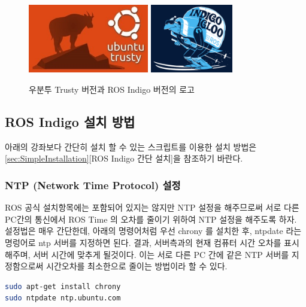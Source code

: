 \begin{figure}[h]
\centering\includegraphics[height=30mm]{pictures/chapter2/ubuntu_14_04.jpg}
\centering\includegraphics[height=30mm]{pictures/chapter2/indigo_igloo.png}
\caption{우분투 Trusty 버전과 ROS Indigo 버전의 로고}
\end{figure}


\subsection{ROS Indigo 설치 방법}
\label{sec:ROSInstallation}

\begin{exercise}[간단 설치]
아래의 강좌보다 간단히 설치 할 수 있는 스크립트를 이용한 설치 방법은 \ref{sec:SimpleInstallation}[ROS Indigo 간단 설치]을 참조하기 바란다.
\end{exercise}

\subsubsection{NTP (Network Time Protocol) 설정}
ROS 공식 설치항목에는 포함되어 있지는 않지만 NTP 설정을 해주므로써 서로 다른 PC간의 통신에서 ROS Time 의 오차를 줄이기 위하여 NTP 설정을 해주도록 하자. 설정법은 매우 간단한데, 아래의 명령어처럼 우선 chrony 를 설치한 후, ntpdate 라는 명렁어로 ntp 서버를 지정하면 된다. 결과, 서버측과의 현재 컴퓨터 시간 오차를 표시해주며, 서버 시간에 맞추게 될것이다. 이는 서로 다른 PC 간에 같은 NTP 서버를 지정함으로써 시간오차를 최소한으로 줄이는 방법이라 할 수 있다.

\begin{lstlisting}[language=bash]
sudo apt-get install chrony
sudo ntpdate ntp.ubuntu.com
\end{lstlisting}

